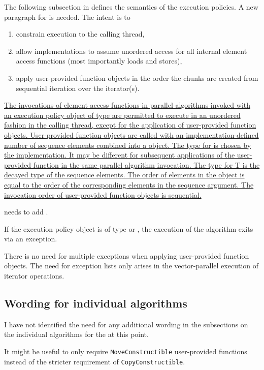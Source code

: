 The following subsection in \citep[§25.2.3]{N4582} defines the semantics of the execution policies.
A new paragraph for \dataparEP is needed.
The intent is to
\begin{enumerate}
  \item constrain execution to the calling thread,
  \item allow implementations to assume unordered access for all internal element access functions (most importantly loads and stores),
  \item apply user-provided function objects in the order the \datapar chunks are created from sequential iteration over the iterator(s).
\end{enumerate}
\begin{wgText}
  \addtocounter{Paras}{5}%
  \color{WgAdd}%
  \uline{%
  \pnum
  The invocations of element access functions in parallel algorithms invoked with an execution policy object of type \dataparEPT are permitted to execute in an unordered fashion in the calling thread, except for the application of user-provided function objects.
  User-provided function objects are called with an im\-ple\-men\-ta\-tion-defined number of sequence elements combined into a }\underline{\datapar[<T, Abi>]}\uline{ object.
  The type for  is chosen by the implementation.
  It may be different for subsequent applications of the user-provided function in the same parallel algorithm invocation.
  The type for \type T is the decayed type of the sequence elements.
  The order of elements in the \datapar object is equal to the order of the corresponding elements in the sequence argument.
  The invocation order of user-provided function objects is sequential.
}
\end{wgText}

\citep[§25.2.4 (2.2)]{N4582} needs to add \dataparEPT.
\begin{wgText}
  If the execution policy object is of type \wgAdd{, \dataparEPT,} or , the execution of the algorithm exits via an exception.
\end{wgText}
There is no need for multiple exceptions when applying user-provided function objects.
The need for exception lists only arises in the vector-parallel execution of iterator operations.

\subsection{Wording for individual algorithms}
I have not identified the need for any additional wording in the subsections on the individual algorithms for the \dataparEPT at this point.

It might be useful to only require \texttt{MoveConstructible} user-provided functions instead of the stricter requirement of \texttt{CopyConstructible}.


